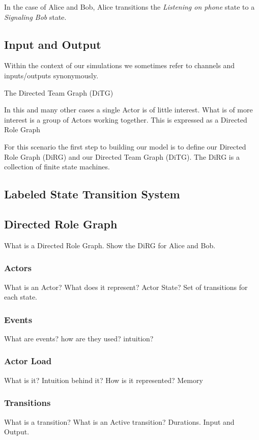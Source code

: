In the case of Alice and Bob, Alice transitions the {\em Listening on phone} state to a {\em Signaling Bob} state.  

\subsection{Input and Output}
Within the context of our simulations we sometimes refer to channels and inputs/outputs synonymously.  


The Directed Team Graph (DiTG) 


In this and many other cases a single Actor is of little interest.  What is of more interest is a group of Actors working together.  This is expressed as a Directed Role Graph

For this scenario the first step to building our model is to define our Directed Role Graph (DiRG) and our Directed Team Graph (DiTG).  The DiRG is a collection of finite state machines.



\subsection{Labeled State Transition System}


\subsection{Directed Role Graph}
What is a Directed Role Graph.  Show the DiRG for Alice and Bob.
\subsubsection{Actors}
What is an Actor?  What does it represent?  Actor State?  Set of transitions for each state.  

\subsubsection{Events}
What are events? how are they used? intuition?

\subsubsection{Actor Load}
What is it? Intuition behind it?  How is it represented? Memory

\subsubsection{Transitions}
What is a transition?  What is an Active transition? Durations.  Input and Output.

